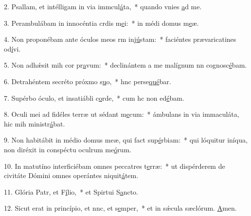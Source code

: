 2. Psallam, et intélligam in via immcul\uline{á}ta,~* quando vnies \uline{a}d me.\par 
3. Perambulábam in innocéntia crdis m\uline{e}i:~* in médi domus m\uline{e}æ.\par 
4. Non proponébam ante óculos meos rm inj\uline{ú}stam:~* faciéntes prævaricatines od\uline{í}vi.\par 
5. Non adhǽsit mih cor pr\uline{a}vum:~* declinántem a me malígnum nn cognosc\uline{é}bam.\par 
6. Detrahéntem secréto próxmo s\uline{u}o,~* hnc perse\uline{qué}bar.\par 
7. Supérbo óculo, et insatiábli c\uline{o}rde,~* cum hc non ed\uline{é}bam.\par 
8. Oculi mei ad fidéles terræ ut sédant m\uline{e}cum:~* ámbulans in via immaculáta, hic mih ministr\uline{á}bat.\par 
9. Non habitábit in médio domus meæ, qui fact sup\uline{é}rbiam:~* qui lóquitur iníqua, non diréxit in conspéctu oculrum me\uline{ó}rum.\par 
10. In matutíno interficiébam omnes peccatres t\uline{e}rræ:~* ut dispérderem de civitáte Dómini omnes operántes niquit\uline{á}tem.\par 
11. Glória Patr, et F\uline{í}lio,~* et Spirtui S\uline{a}ncto.\par 
12. Sicut erat in princípio, et nnc, et s\uline{e}mper,~* et in sǽcula sæclórum. \uline{A}men.\par 
